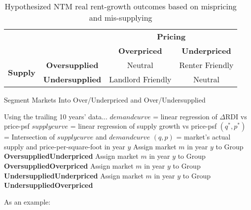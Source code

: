 \documentclass[sn-mathphys-num]{sn-jnl}%
\theoremstyle{thmstyleone}%
\theoremstyle{thmstyletwo}%
\theoremstyle{thmstylethree}%
\begin{document}
\begin{table}[h!]
\centering
\begin{tabular}{cc|c|c|}
\multicolumn{2}{c}{} & \multicolumn{2}{c}{\textbf{Pricing}} \\
\multicolumn{2}{c}{} & \textbf{Overpriced} & \textbf{Underpriced} \\
\cmidrule{3-4}
\multirow{2}{*}{\textbf{Supply}} & \textbf{Oversupplied} & Neutral & Renter Friendly \\\cmidrule{2-4}
 & \textbf{Undersupplied} & Landlord Friendly & Neutral \\
\bottomrule
\end{tabular}
\caption{Hypothesized NTM real rent-growth outcomes based on mispricing and mis-supplying}
\end{table}


\begin{algorithm}
	\caption{Segment Markets Into Over/Underpriced and Over/Undersupplied}\label{alg:market_segmentation}
	\begin{algorithmic}[1]
		        \State Using the trailing 10 years' data...
		        \State $demandcurve$ = linear regression of  $\Delta\text{RDI}$  vs price-psf
		        \State $supplycurve$ = linear regression of supply growth vs price-psf
		        \State $(q^*, p^*)$ = Intersection of $supplycurve$ and $demandcurve$
		        \State $(q, p)$ = market's actual supply and price-per-square-foot in year $y$
		                \State Assign market $m$ in year $y$ to Group \textbf{OversuppliedUnderpriced}
		            \Else
		                \State Assign market $m$ in year $y$ to Group \textbf{OversuppliedOverpriced}
		            \EndIf
		        \Else
		                \State Assign market $m$ in year $y$ to Group \textbf{UndersuppliedUnderpriced}
		            \Else
		                \State Assign market $m$ in year $y$ to Group \textbf{UndersuppliedOverpriced}
		            \EndIf
		        \EndIf
		    \EndFor
		\EndFor
	\end{algorithmic}
\end{algorithm}


As an example:
\end{document}

